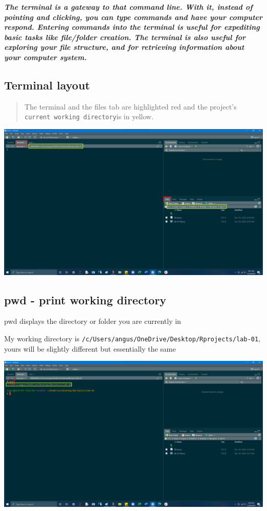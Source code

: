 \documentclass[
]{article}
\begin{document}
\textbf{\emph{The terminal is a gateway to that command line. With it,
instead of pointing and clicking, you can type commands and have your
computer respond. Entering commands into the terminal is useful for
expediting basic tasks like file/folder creation. The terminal is also
useful for exploring your file structure, and for retrieving information
about your computer system.}}

\hypertarget{terminal-layout}{%
\subsection{\texorpdfstring{\textbf{Terminal
layout}}{Terminal layout}}\label{terminal-layout}}

\begin{quote}
The {terminal} and the {files tab} are highlighted red and the project's
\texttt{current\ working\ directory}is in yellow.
\end{quote}

\includegraphics{img/terminal-empty.png}

\hypertarget{pwd---print-working-directory}{%
\subsection{\texorpdfstring{{pwd} - print working
directory}{pwd - print working directory}}\label{pwd---print-working-directory}}

pwd displays the directory or folder you are currently in

My working directory is
\texttt{/c/Users/angus/OneDrive/Desktop/Rprojects/lab-01}, yours will be
slightly different but essentially the same

\includegraphics{img/pwd-2.png}
\end{document}
